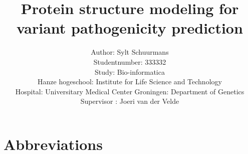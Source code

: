 \documentclass[10pt]{article}
\begin{document}
	\title{Protein structure modeling for variant pathogenicity prediction}
	\author{Author: Sylt Schuurmans\\
		Studentnumber: 333332\\
		Study: Bio-informatica\\
		Hanze hogeschool: Institute for Life Science and Technology\\
		Hospital: Universitary Medical Center Groningen: Department of Genetics\\
		Supervisor : Joeri van der Velde}
	\maketitle
	\newpage
	
	
	
	\tableofcontents
	\newpage
	
	\listoffigures
	\newpage
	
	\section*{Abbreviations}
	
	\newpage
	
%	
%	
%
%	
%	
%	
%	
%	
%	
%	
	
	
\end{document}
